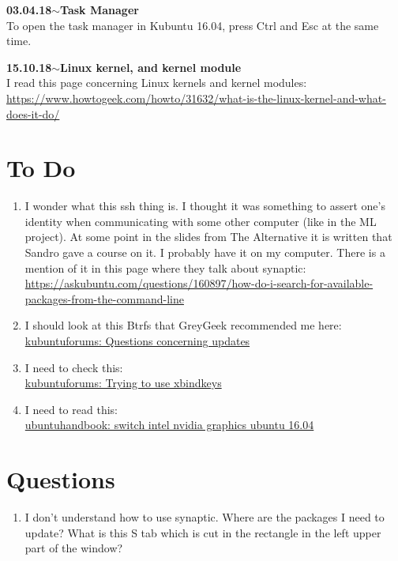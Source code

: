 \documentclass[11pt,a4paper]{article}
\newenvironment{loggentry}[2]%
{\noindent\textbf{#1}\hspace{1cm}$\mathbf{\sim}$\text{ }\textbf{#2}\\}{\vspace{0.5cm}}
\begin{document}
\begin{loggentry}{03.04.18}{Task Manager}
To open the task manager in Kubuntu 16.04, press Ctrl and Esc at the same time.
\end{loggentry}

\begin{loggentry}{15.10.18}{Linux kernel, and kernel module}

I read this page concerning Linux kernels and kernel modules:\\
\url{https://www.howtogeek.com/howto/31632/what-is-the-linux-kernel-and-what-does-it-do/}

\end{loggentry}

\section{To Do}
\begin{enumerate}
\item I wonder what this ssh thing is. I thought it was something to assert one's identity when communicating with some other computer (like in the ML project). At some point in the slides from The Alternative it is written that Sandro gave a course on it. I probably have it on my computer. There is a mention of it in this page where they talk about synaptic:\\
\url{https://askubuntu.com/questions/160897/how-do-i-search-for-available-packages-from-the-command-line}
\item I should look at this Btrfs that GreyGeek recommended me here:\\
\href{https://www.kubuntuforums.net/showthread.php/72837-Questions-concerning-updates?p=408673#post408673}{kubuntuforums: Questions concerning updates}
\item I need to check this:\\
\href{https://www.kubuntuforums.net/showthread.php/72847-Trying-to-use-xbindkeys?p=408761#post408761}{kubuntuforums: Trying to use xbindkeys}
\item I need to read this:\\
\href{http://ubuntuhandbook.org/index.php/2016/04/switch-intel-nvidia-graphics-ubuntu-16-04/}{ubuntuhandbook: switch intel nvidia graphics ubuntu 16.04}
\end{enumerate}

\section{Questions}
\begin{enumerate}
\item I don't understand how to use synaptic. Where are the packages I need to update? What is this S tab which is cut in the rectangle in the left upper part of the window?
\end{enumerate}
\end{document}
